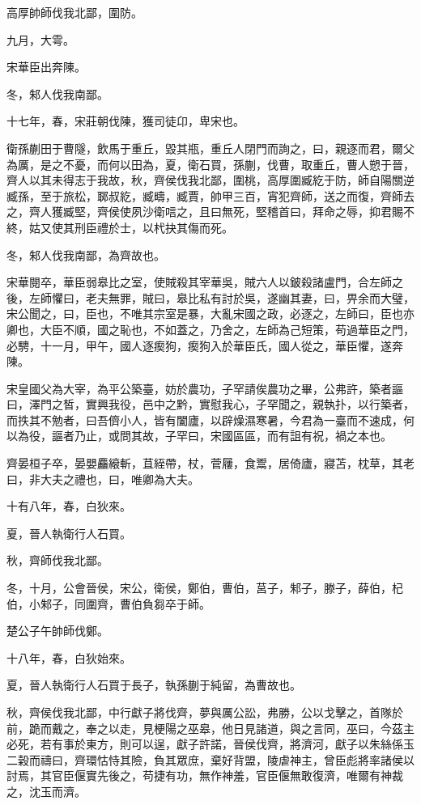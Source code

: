 \begin{pinyinscope}
高厚帥師伐我北鄙，圍防。

九月，大雩。

宋華臣出奔陳。

冬，邾人伐我南鄙。

十七年，春，宋莊朝伐陳，獲司徒卬，卑宋也。

衛孫蒯田于曹隧，飲馬于重丘，毀其瓶，重丘人閉門而詢之，曰，親逐而君，爾父為厲，是之不憂，而何以田為，夏，衛石買，孫蒯，伐曹，取重丘，曹人愬于晉，齊人以其未得志于我故，秋，齊侯伐我北鄙，圍桃，高厚圍臧紇于防，師自陽關逆臧孫，至于旅松，郰叔紇，臧疇，臧賈，帥甲三百，宵犯齊師，送之而復，齊師去之，齊人獲臧堅，齊侯使夙沙衛唁之，且曰無死，堅稽首曰，拜命之辱，抑君賜不終，姑又使其刑臣禮於士，以杙抉其傷而死。

冬，邾人伐我南鄙，為齊故也。

宋華閱卒，華臣弱皋比之室，使賊殺其宰華吳，賊六人以鈹殺諸盧門，合左師之後，左師懼曰，老夫無罪，賊曰，皋比私有討於吳，遂幽其妻，曰，畀余而大璧，宋公聞之，曰，臣也，不唯其宗室是暴，大亂宋國之政，必逐之，左師曰，臣也亦卿也，大臣不順，國之恥也，不如蓋之，乃舍之，左師為己短策，苟過華臣之門，必騁，十一月，甲午，國人逐瘈狗，瘈狗入於華臣氏，國人從之，華臣懼，遂奔陳。

宋皇國父為大宰，為平公築臺，妨於農功，子罕請俟農功之畢，公弗許，築者謳曰，澤門之皙，實興我役，邑中之黔，實慰我心，子罕聞之，親執扑，以行築者，而抶其不勉者，曰吾儕小人，皆有闔廬，以辟燥濕寒暑，今君為一臺而不速成，何以為役，謳者乃止，或問其故，子罕曰，宋國區區，而有詛有祝，禍之本也。

齊晏桓子卒，晏嬰麤縗斬，苴絰帶，杖，菅屨，食鬻，居倚廬，寢苫，枕草，其老曰，非大夫之禮也，曰，唯卿為大夫。

十有八年，春，白狄來。

夏，晉人執衛行人石買。

秋，齊師伐我北鄙。

冬，十月，公會晉侯，宋公，衛侯，鄭伯，曹伯，莒子，邾子，滕子，薛伯，杞伯，小邾子，同圍齊，曹伯負芻卒于師。

楚公子午帥師伐鄭。

十八年，春，白狄始來。

夏，晉人執衛行人石買于長子，執孫蒯于純留，為曹故也。

秋，齊侯伐我北鄙，中行獻子將伐齊，夢與厲公訟，弗勝，公以戈擊之，首隊於前，跪而戴之，奉之以走，見梗陽之巫皋，他日見諸道，與之言同，巫曰，今茲主必死，若有事於東方，則可以逞，獻子許諾，晉侯伐齊，將濟河，獻子以朱絲係玉二榖而禱曰，齊環怙恃其險，負其眾庶，棄好背盟，陵虐神主，曾臣彪將率諸侯以討焉，其官臣偃實先後之，苟捷有功，無作神羞，官臣偃無敢復濟，唯爾有神裁之，沈玉而濟。


\end{pinyinscope}
